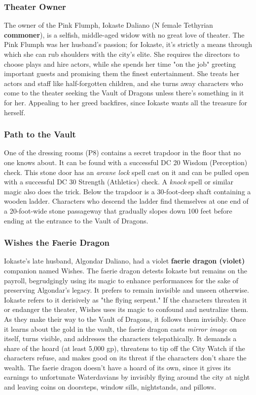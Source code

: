 \documentclass[10pt,a4paper,twoside,twocolumn,openany,nodeprecatedcode]{dndbook}
\begin{document}
\subsubsection{Theater Owner}
The owner of the Pink Flumph, Iokaste Daliano (N female Tethyrian \textbf{commoner}), is a selfish, middle-aged widow with no great love of theater. The Pink Flumph was her husband's passion; for Iokaste, it's strictly a means through which she can rub shoulders with the city's elite. She requires the directors to choose plays and hire actors, while she spends her time "on the job" greeting important guests and promising them the finest entertainment. She treats her actors and staff like half-forgotten children, and she turns away characters who come to the theater seeking the Vault of Dragons unless there's something in it for her. Appealing to her greed backfires, since Iokaste wants all the treasure for herself.
\subsubsection{Path to the Vault}
One of the dressing rooms (P8) contains a secret trapdoor in the floor that no one knows about. It can be found with a successful DC 20 Wisdom (Perception) check. This stone door has an \textit{arcane lock} spell cast on it and can be pulled open with a successful DC 30 Strength (Athletics) check. A \textit{knock} spell or similar magic also does the trick.
Below the trapdoor is a 30-foot-deep shaft containing a wooden ladder. Characters who descend the ladder find themselves at one end of a 20-foot-wide stone passageway that gradually slopes down 100 feet before ending at the entrance to the Vault of Dragons.
\subsubsection{Wishes the Faerie Dragon}
Iokaste's late husband, Algondar Daliano, had a violet \textbf{faerie dragon (violet)} companion named Wishes. The faerie dragon detests Iokaste but remains on the payroll, begrudgingly using its magic to enhance performances for the sake of preserving Algondar's legacy. It prefers to remain invisible and unseen otherwise. Iokaste refers to it derisively as "the flying serpent."
If the characters threaten it or endanger the theater, Wishes uses its magic to confound and neutralize them. As they make their way to the Vault of Dragons, it follows them invisibly. Once it learns about the gold in the vault, the faerie dragon casts \textit{mirror image} on itself, turns visible, and addresses the characters telepathically. It demands a share of the hoard (at least 5,000 gp), threatens to tip off the City Watch if the characters refuse, and makes good on its threat if the characters don't share the wealth. The faerie dragon doesn't have a hoard of its own, since it gives its earnings to unfortunate Waterdavians by invisibly flying around the city at night and leaving coins on doorsteps, window sills, nightstands, and pillows.
\end{document}
